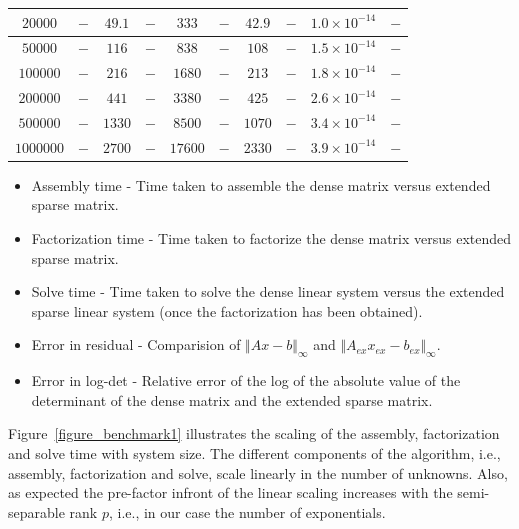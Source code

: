 \documentclass[times]{nlaauth}
\begin{document}
\begin{table}[!htbp]
\begin{center}
\begin{tabular}{|c|c|c|c|c|c|c|c|c|c|}
\hline
$20000$ & $-$ & $49.1$ & $-$ & $333$ & $-$ & $42.9$ & $-$ & $1.0 \times 10^{-14}$ & $-$\\
\hline
$50000$ & $-$ & $116$ & $-$ & $838$ & $-$ & $108$ & $-$ & $1.5 \times 10^{-14}$ & $-$\\
\hline
$100000$ & $-$ & $216$ & $-$ & $1680$ & $-$ & $213$ & $-$ & $1.8 \times 10^{-14}$ & $-$\\
\hline
$200000$ & $-$ & $441$ & $-$ & $3380$ & $-$ & $425$ & $-$ & $2.6 \times 10^{-14}$ & $-$\\
\hline
$500000$ & $-$ & $1330$ & $-$ & $8500$ & $-$ & $1070$ & $-$ & $3.4 \times 10^{-14}$ & $-$\\
\hline
$1000000$ & $-$ & $2700$ & $-$ & $17600$ & $-$ & $2330$ & $-$ & $3.9 \times 10^{-14}$ & $-$\\
\hline
\end{tabular}
\end{center}
\label{table_N_scaling}
\end{table}
\begin{itemize}
\item
Assembly time - Time taken to assemble the dense matrix versus extended sparse matrix.
\item
Factorization time - Time taken to factorize the dense matrix versus extended sparse matrix.
\item
Solve time - Time taken to solve the dense linear system versus the extended sparse linear system (once the factorization has been obtained).
\item
Error in residual - Comparision of $\Vert Ax-b\Vert_{\infty}$ and $\Vert A_{ex}x_{ex} - b_{ex}\Vert_{\infty}$.
\item
Error in log-det - Relative error of the log of the absolute value of the determinant of the dense matrix and the extended sparse matrix.
\end{itemize}


Figure~\ref{figure_benchmark1} illustrates the scaling of the assembly, factorization and solve time with system size. The different components of the algorithm, i.e., assembly, factorization and solve, scale linearly in the number of unknowns. Also, as expected the pre-factor infront of the linear scaling increases with the semi-separable rank $p$, i.e., in our case the number of exponentials.
\end{document}
